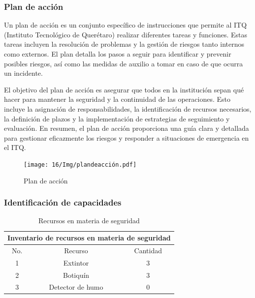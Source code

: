\subsubsection{Plan de acción}
Un plan de acción es un conjunto específico de instrucciones que permite al ITQ (Instituto Tecnológico de Querétaro) realizar diferentes tareas y funciones. Estas tareas incluyen la resolución de problemas y la gestión de riesgos tanto internos como externos. El plan detalla los pasos a seguir para identificar y prevenir posibles riesgos, así como las medidas de auxilio a tomar en caso de que ocurra un incidente.

El objetivo del plan de acción es asegurar que todos en la institución sepan qué hacer para mantener la seguridad y la continuidad de las operaciones. Esto incluye la asignación de responsabilidades, la identificación de recursos necesarios, la definición de plazos y la implementación de estrategias de seguimiento y evaluación. En resumen, el plan de acción proporciona una guía clara y detallada para gestionar eficazmente los riesgos y responder a situaciones de emergencia en el ITQ.
%
%
\begin{figure}[H]
        \centering
        \texttt{[image: 16/Img/plandeacción.pdf]}
        \caption{Plan de acción}
        \label{Plan de acción}
    \end{figure}
%
%
\subsubsection{Identificación de capacidades}

\begin{table}[H]
    \centering
    \caption{Recursos en materia de seguridad}
    \begin{tabular}{c c c}
    \hline
    \multicolumn{3}{c}{Inventario de recursos en materia de seguridad}\\
    \hline
         No.& Recurso & Cantidad  \\
    \hline
         1& Extintor &  3 \\
    \hline
         2& Botiquín & 3 \\
    \hline
         3& Detector de humo & 0 \\
    \hline     
    \end{tabular}
    \label{tab:inventario}
\end{table}
% 
% 
